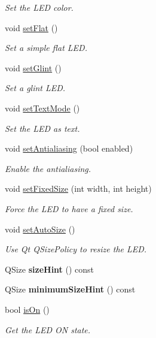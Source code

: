 \begin{DoxyCompactItemize}
\begin{DoxyCompactList}\small\item\em Set the LED color. \end{DoxyCompactList}\item 
void \hyperlink{classmdt_led_a664ca4c83ec0faaa86bd3f932fb06d5b}{setFlat} ()
\begin{DoxyCompactList}\small\item\em Set a simple flat LED. \end{DoxyCompactList}\item 
void \hyperlink{classmdt_led_a8ec814fdc4910476e7479649ba3f6204}{setGlint} ()
\begin{DoxyCompactList}\small\item\em Set a glint LED. \end{DoxyCompactList}\item 
void \hyperlink{classmdt_led_a6aabb78ea686814f316f88e20d024d39}{setTextMode} ()
\begin{DoxyCompactList}\small\item\em Set the LED as text. \end{DoxyCompactList}\item 
void \hyperlink{classmdt_led_ab8a997e610a2ad5572e1a6dbe7fbc256}{setAntialiasing} (bool enabled)
\begin{DoxyCompactList}\small\item\em Enable the antialiasing. \end{DoxyCompactList}\item 
void \hyperlink{classmdt_led_abd0fde0ce1eca75fe7c832557829089b}{setFixedSize} (int width, int height)
\begin{DoxyCompactList}\small\item\em Force the LED to have a fixed size. \end{DoxyCompactList}\item 
void \hyperlink{classmdt_led_a696570e6eb8f5b0a629fc6823ed2fe4d}{setAutoSize} ()
\begin{DoxyCompactList}\small\item\em Use Qt QSizePolicy to resize the LED. \end{DoxyCompactList}\item 
\hypertarget{classmdt_led_a44cf6e19e2640bc843d1ed096843e686}{
QSize {\bfseries sizeHint} () const }
\label{classmdt_led_a44cf6e19e2640bc843d1ed096843e686}

\item 
\hypertarget{classmdt_led_ae7d22257f19d57771299b321a8a17c50}{
QSize {\bfseries minimumSizeHint} () const }
\label{classmdt_led_ae7d22257f19d57771299b321a8a17c50}

\item 
\hypertarget{classmdt_led_a97c9b46867c260cb27901e2968146809}{
bool \hyperlink{classmdt_led_a97c9b46867c260cb27901e2968146809}{isOn} ()}
\label{classmdt_led_a97c9b46867c260cb27901e2968146809}

\begin{DoxyCompactList}\small\item\em Get the LED ON state. \end{DoxyCompactList}\end{DoxyCompactItemize}
